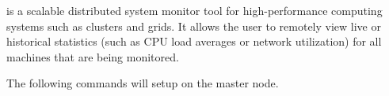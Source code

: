 \Ganglia{} is a scalable distributed system monitor tool for high-performance computing systems such as clusters and grids. It allows the user to remotely view live or historical statistics (such as CPU load averages or network utilization) for all machines that are being monitored.

The following commands will setup \Ganglia{} on the master node.
